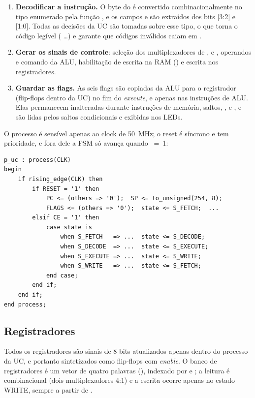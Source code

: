 \begin{enumerate}[nosep]
  \item \textbf{Decodificar a instrução.} O byte do  é convertido
        combinacionalmente no tipo enumerado  pela função
        , e os campos  e  são extraídos dos bits
        [3:2] e [1:0]. Todas as decisões da UC são tomadas sobre esse tipo, o
        que torna o código legível ( \ldots) e garante que
        códigos inválidos caiam em .
  \item \textbf{Gerar os sinais de controle}: seleção dos multiplexadores de
        ,  e , operandos e comando da ALU,
        habilitação de escrita na RAM () e escrita nos registradores.
  \item \textbf{Guardar as flags.} As seis flags são copiadas da ALU para o
        registrador  (flip-flops dentro da UC) no fim do
        \emph{execute}, e apenas nas instruções de ALU. Elas permanecem
        inalteradas durante instruções de memória, saltos, ,
         e , e são lidas pelos saltos condicionais e
        exibidas nos LEDs.
\end{enumerate}

O processo é sensível apenas ao clock de \SI{50}{\mega\hertz}; o reset é
síncrono e tem prioridade, e fora dele a FSM só avança quando ~=~1:

\begin{lstlisting}[style=vhdl, caption={Estrutura do processo da UC (trecho de \texttt{cpu.vhd}).}]
p_uc : process(CLK)
begin
    if rising_edge(CLK) then
        if RESET = '1' then
            PC <= (others => '0');  SP <= to_unsigned(254, 8);
            FLAGS <= (others => '0');  state <= S_FETCH;  ...
        elsif CE = '1' then
            case state is
                when S_FETCH   => ...  state <= S_DECODE;
                when S_DECODE  => ...  state <= S_EXECUTE;
                when S_EXECUTE => ...  state <= S_WRITE;
                when S_WRITE   => ...  state <= S_FETCH;
            end case;
        end if;
    end if;
end process;
\end{lstlisting}

\subsection{Registradores}

Todos os registradores são sinais de 8 bits atualizados apenas dentro do
processo da UC, e portanto sintetizados como flip-flops com \emph{enable}. O
banco de registradores é um vetor de quatro palavras (),
indexado por  e ; a leitura é combinacional (dois
multiplexadores 4:1) e a escrita ocorre apenas no estado WRITE, sempre a partir
de .

